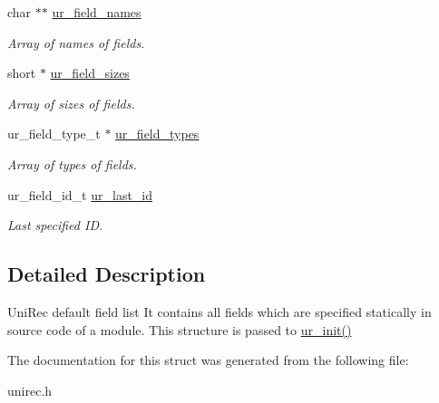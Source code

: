 \begin{DoxyCompactItemize}
\item 
char $\ast$$\ast$ \hyperlink{structur__static__field__specs__t_a98353be825cf3f1fb16c73e048ea0b74}{ur\+\_\+field\+\_\+names}\hypertarget{structur__static__field__specs__t_a98353be825cf3f1fb16c73e048ea0b74}{}\label{structur__static__field__specs__t_a98353be825cf3f1fb16c73e048ea0b74}

\begin{DoxyCompactList}\small\item\em Array of names of fields. \end{DoxyCompactList}\item 
short $\ast$ \hyperlink{structur__static__field__specs__t_a802e8538253f5509acc14f2da2b225f6}{ur\+\_\+field\+\_\+sizes}\hypertarget{structur__static__field__specs__t_a802e8538253f5509acc14f2da2b225f6}{}\label{structur__static__field__specs__t_a802e8538253f5509acc14f2da2b225f6}

\begin{DoxyCompactList}\small\item\em Array of sizes of fields. \end{DoxyCompactList}\item 
ur\+\_\+field\+\_\+type\+\_\+t $\ast$ \hyperlink{structur__static__field__specs__t_ad5306965acd4764b31d6634a0947e7a2}{ur\+\_\+field\+\_\+types}\hypertarget{structur__static__field__specs__t_ad5306965acd4764b31d6634a0947e7a2}{}\label{structur__static__field__specs__t_ad5306965acd4764b31d6634a0947e7a2}

\begin{DoxyCompactList}\small\item\em Array of types of fields. \end{DoxyCompactList}\item 
ur\+\_\+field\+\_\+id\+\_\+t \hyperlink{structur__static__field__specs__t_a8489cc7746e8177392cdd13465e96547}{ur\+\_\+last\+\_\+id}\hypertarget{structur__static__field__specs__t_a8489cc7746e8177392cdd13465e96547}{}\label{structur__static__field__specs__t_a8489cc7746e8177392cdd13465e96547}

\begin{DoxyCompactList}\small\item\em Last specified ID. \end{DoxyCompactList}\end{DoxyCompactItemize}


\subsection{Detailed Description}
Uni\+Rec default field list It contains all fields which are specified statically in source code of a module. This structure is passed to \hyperlink{unirec_8c_a238d68dc4d1dc5b0369e907b0e2d9711}{ur\+\_\+init()} 

The documentation for this struct was generated from the following file\+:\begin{DoxyCompactItemize}
\item 
unirec.\+h\end{DoxyCompactItemize}
